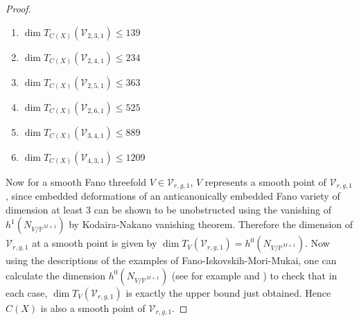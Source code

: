 \documentclass[11pt,twoside]{amsart}
\theoremstyle{plain}
\numberwithin{equation}{section}
\theoremstyle{definition}
\begin{document}
\begin{proof}
\begin{enumerate}

      

      
      \item $\operatorname{dim}T_{C(X)}(\mathcal{V}_{2,3,1}) \leq 139$

      \item $\operatorname{dim}T_{C(X)}(\mathcal{V}_{2,4,1}) \leq 234$

      \item $\operatorname{dim}T_{C(X)}(\mathcal{V}_{2,5,1}) \leq 363$

      \item $\operatorname{dim}T_{C(X)}(\mathcal{V}_{2,6,1}) \leq 525$

      \item $\operatorname{dim}T_{C(X)}(\mathcal{V}_{3,4,1}) \leq 889$

      \item $\operatorname{dim}T_{C(X)}(\mathcal{V}_{4,3,1}) \leq 1209$
  \end{enumerate}
Now for a smooth Fano threefold $V \in \mathcal{V}_{r,g,1}$, $V$ represents a smooth point of $\mathcal{V}_{r,g,1}$, since embedded deformations of an anticanonically embedded Fano variety of dimension at least $3$ can be shown to be unobstructed using the vanishing of $h^1(N_{V/\mathbb{P}^{M+1}})$ by Kodaira-Nakano vanishing theorem. Therefore the dimension of $\mathcal{V}_{r,g,1}$ at a smooth point is given by $\operatorname{dim}T_V(\mathcal{V}_{r,g,1}) = h^0(N_{V/\mathbb{P}^{M+1}})$. Now using the descriptions of the examples of Fano-Iskovskih-Mori-Mukai, one can calculate the dimension $h^0(N_{V/\mathbb{P}^{M+1}})$ (see for example \cite[Table $2$, pg $666$]{CLM93} and \cite[Table $3.1$]{CLM98}) to check that in each case, $\operatorname{dim}T_V(\mathcal{V}_{r,g,1})$ is exactly the upper bound just obtained. Hence $C(X)$ is also a smooth point of $\mathcal{V}_{r,g,1}$. 

  
\end{proof}
\end{document}
